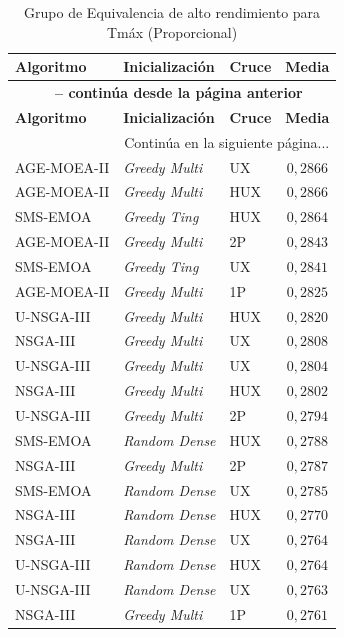 \begin{longtable}{lllc}
    \caption{Grupo de Equivalencia de alto rendimiento para Tmáx (Proporcional)}
    \label{tab:elite_maxt_prop} \\
    \toprule
    \textbf{Algoritmo} & \textbf{Inicialización} & \textbf{Cruce} & \textbf{Media} \\
    \midrule
    \endfirsthead
    \multicolumn{4}{c}{{\bfseries \tablename\ \thetable{} -- continúa desde la página anterior}} \\
    \toprule
    \textbf{Algoritmo} & \textbf{Inicialización} & \textbf{Cruce} & \textbf{Media} \\
    \midrule
    \endhead
    \midrule \multicolumn{4}{r}{{Continúa en la siguiente página...}} \\
    \endfoot
    \bottomrule
    \endlastfoot
    AGE-MOEA-II & \textit{Greedy Multi} & UX & $0{,}2866$ \\
AGE-MOEA-II & \textit{Greedy Multi} & HUX & $0{,}2866$ \\
SMS-EMOA & \textit{Greedy Ting} & HUX & $0{,}2864$ \\
AGE-MOEA-II & \textit{Greedy Multi} & 2P & $0{,}2843$ \\
SMS-EMOA & \textit{Greedy Ting} & UX & $0{,}2841$ \\
AGE-MOEA-II & \textit{Greedy Multi} & 1P & $0{,}2825$ \\
U-NSGA-III & \textit{Greedy Multi} & HUX & $0{,}2820$ \\
NSGA-III & \textit{Greedy Multi} & UX & $0{,}2808$ \\
U-NSGA-III & \textit{Greedy Multi} & UX & $0{,}2804$ \\
NSGA-III & \textit{Greedy Multi} & HUX & $0{,}2802$ \\
U-NSGA-III & \textit{Greedy Multi} & 2P & $0{,}2794$ \\
SMS-EMOA & \textit{Random Dense} & HUX & $0{,}2788$ \\
NSGA-III & \textit{Greedy Multi} & 2P & $0{,}2787$ \\
SMS-EMOA & \textit{Random Dense} & UX & $0{,}2785$ \\
NSGA-III & \textit{Random Dense} & HUX & $0{,}2770$ \\
NSGA-III & \textit{Random Dense} & UX & $0{,}2764$ \\
U-NSGA-III & \textit{Random Dense} & HUX & $0{,}2764$ \\
U-NSGA-III & \textit{Random Dense} & UX & $0{,}2763$ \\
NSGA-III & \textit{Greedy Multi} & 1P & $0{,}2761$ \\

\end{longtable}
